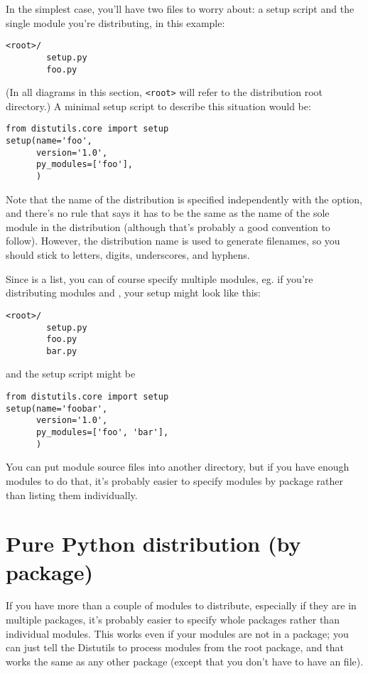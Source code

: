 \documentclass{manual}
\begin{document}
In the simplest case, you'll have two files to worry about: a setup
script and the single module you're distributing,  in this
example:
\begin{verbatim}
<root>/
        setup.py
        foo.py
\end{verbatim}
(In all diagrams in this section, \verb|<root>| will refer to the
distribution root directory.)  A minimal setup script to describe this
situation would be:
\begin{verbatim}
from distutils.core import setup
setup(name='foo',
      version='1.0',
      py_modules=['foo'],
      )
\end{verbatim}
Note that the name of the distribution is specified independently with
the  option, and there's no rule that says it has to be the
same as the name of the sole module in the distribution (although that's
probably a good convention to follow).  However, the distribution name
is used to generate filenames, so you should stick to letters, digits,
underscores, and hyphens.

Since  is a list, you can of course specify multiple 
modules, eg. if you're distributing modules  and
, your setup might look like this:
\begin{verbatim}
<root>/
        setup.py
        foo.py
        bar.py
\end{verbatim}
and the setup script might be
\begin{verbatim}
from distutils.core import setup
setup(name='foobar',
      version='1.0',
      py_modules=['foo', 'bar'],
      )
\end{verbatim}

You can put module source files into another directory, but if you have
enough modules to do that, it's probably easier to specify modules by
package rather than listing them individually.


\section{Pure Python distribution (by package)}
\label{pure-pkg}

If you have more than a couple of modules to distribute, especially if
they are in multiple packages, it's probably easier to specify whole
packages rather than individual modules.  This works even if your
modules are not in a package; you can just tell the Distutils to process
modules from the root package, and that works the same as any other
package (except that you don't have to have an 
file).
\end{document}
